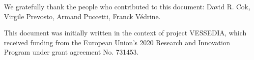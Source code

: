 \documentclass[web]{frama-c-book}
\begin{document}
We gratefully thank the people who contributed to this document:
David R. Cok, Virgile Prevosto, Armand Puccetti, Franck Védrine.

This document was initially written in the context of project VESSEDIA,
which received funding from the European Union's 2020
Research and Innovation Program under grant agreement
No. 731453.













\appendix




\end{document}
